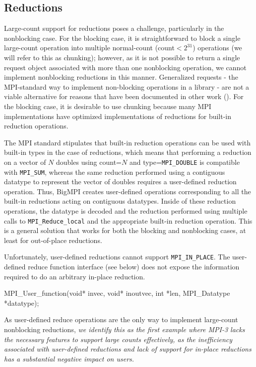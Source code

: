 
\subsection{Reductions}
\label{sec:reductions}

Large-count support for reductions poses a challenge, particularly in the nonblocking case.
For the blocking case, it is straightforward to block a single large-count operation into
multiple normal-count (count$<2^{31}$) operations (we will refer to this as chunking); 
however, as it is not possible to return a single request object associated with more than 
one nonblocking operation, we cannot implement nonblocking reductions in this manner.
Generalized requests - the MPI-standard way to implement non-blocking operations 
in a library - are not a viable alternative for reasons that have been documented 
in other work (\cite{latham:grequest-extensions}).
For the blocking case, it is desirable to use chunking because many MPI implementations 
have optimized implementations of reductions for built-in reduction operations.

The MPI standard stipulates that built-in reduction operations can be used with built-in types
in the case of reductions, which means that performing a reduction on a vector of $N$
doubles using count=$N$ and type=\texttt{MPI\_DOUBLE} is compatible with \texttt{MPI\_SUM},
whereas the same reduction performed using a contiguous datatype to represent the vector
of doubles requires a user-defined reduction operation.
Thus, BigMPI creates user-defined operations corresponding to all the built-in reductions
acting on contiguous datatypes.  Inside of these reduction operations, the datatype is
decoded and the reduction performed using multiple calls to \texttt{MPI\_Reduce\_local}
and the appropriate built-in reduction operation.
This is a general solution that works for both the blocking and nonblocking cases,
at least for out-of-place reductions.

Unfortunately, user-defined reductions cannot support \texttt{MPI\_IN\_PLACE}.
The user-defined reduce function interface (see below) does not expose
the information required to do an arbitrary in-place reduction.
\begin{code}
MPI_User_function(void* invec, void* inoutvec, 
                  int *len, MPI_Datatype *datatype);
\end{code}
As user-defined reduce operations are the only way to implement
large-count nonblocking reductions, \textit{we identify this as the first example
where MPI-3 lacks the necessary features to support large counts effectively,
as the inefficiency associated with user-defined reductions and lack of support
for in-place reductions has a substantial negative impact on users.}